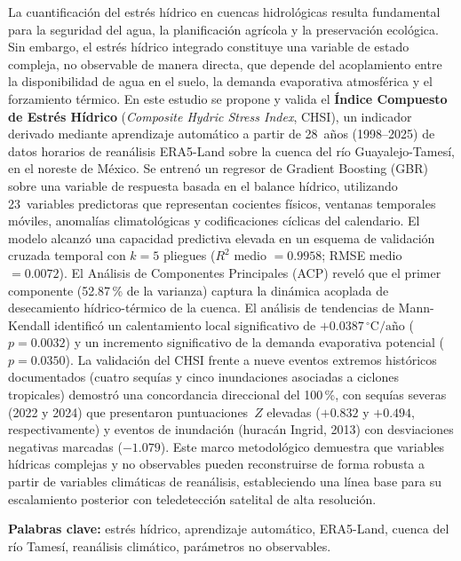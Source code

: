 \documentclass[12pt, a4paper]{article}
\begin{document}
La cuantificación del estrés hídrico en cuencas hidrológicas resulta fundamental para la seguridad del agua, la planificación agrícola y la preservación ecológica. Sin embargo, el estrés hídrico integrado constituye una variable de estado compleja, no observable de manera directa, que depende del acoplamiento entre la disponibilidad de agua en el suelo, la demanda evaporativa atmosférica y el forzamiento térmico. En este estudio se propone y valida el \textbf{Índice Compuesto de Estrés Hídrico} (\emph{Composite Hydric Stress Index}, CHSI), un indicador derivado mediante aprendizaje automático a partir de 28~años (1998--2025) de datos horarios de reanálisis ERA5-Land sobre la cuenca del río Guayalejo-Tamesí, en el noreste de México. Se entrenó un regresor de Gradient Boosting (GBR) sobre una variable de respuesta basada en el balance hídrico, utilizando 23~variables predictoras que representan cocientes físicos, ventanas temporales móviles, anomalías climatológicas y codificaciones cíclicas del calendario. El modelo alcanzó una capacidad predictiva elevada en un esquema de validación cruzada temporal con $k = 5$ pliegues ($R^2$ medio $= 0.9958$; RMSE medio $= 0.0072$). El Análisis de Componentes Principales (ACP) reveló que el primer componente (52.87\,\% de la varianza) captura la dinámica acoplada de desecamiento hídrico-térmico de la cuenca. El análisis de tendencias de Mann-Kendall identificó un calentamiento local significativo de $+0.0387\,^\circ\text{C/año}$ ($p = 0.0032$) y un incremento significativo de la demanda evaporativa potencial ($p = 0.0350$). La validación del CHSI frente a nueve eventos extremos históricos documentados (cuatro sequías y cinco inundaciones asociadas a ciclones tropicales) demostró una concordancia direccional del 100\,\%, con sequías severas (2022 y 2024) que presentaron puntuaciones~$Z$ elevadas ($+0.832$ y $+0.494$, respectivamente) y eventos de inundación (huracán Ingrid, 2013) con desviaciones negativas marcadas ($-1.079$). Este marco metodológico demuestra que variables hídricas complejas y no observables pueden reconstruirse de forma robusta a partir de variables climáticas de reanálisis, estableciendo una línea base para su escalamiento posterior con teledetección satelital de alta resolución.

\vspace{0.5cm}
\noindent\textbf{Palabras clave:} estrés hídrico, aprendizaje automático, ERA5-Land, cuenca del río Tamesí, reanálisis climático, parámetros no observables.

\newpage
\end{document}
